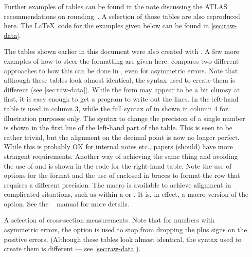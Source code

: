 \documentclass[REPORT=false, UKenglish]{atlasdoc}
\begin{document}
Further examples of tables can be found in the note discussing the ATLAS recommendations on rounding~\cite{atlas-rounding}.
A selection of those tables are also reproduced here.
The \LaTeX\ code for the examples given below can be found in \cref{sec:raw-data}.

The tables shown earlier in this document were also created with .
A few more examples of how to steer the formatting are given here.
 compares two different approaches
to how this can be done  in , even for asymmetric errors.  Note that although these
tables look almost identical, the syntax used to create them is different (see \cref{sec:raw-data}).
While the form may appear to be a bit clumsy at first, it is easy enough to get a
program to write out the lines. In the left-hand table
 is used in column 3, while the full syntax of 
in shown in column 4 for illustration purposes only.
The syntax
to change the precision of a single number is shown in the first line of
the left-hand part of the table.
This is seen to be rather trivial,
but the alignment on the decimal point is now no longer perfect.
While this is probably OK for internal notes etc., papers
(should) have more stringent requirements.
Another way of achieving
the same thing and avoiding the use of  and
 is shown in the code for the right-hand table.
Note the
use of options for the  format and the use of  enclosed
in braces to format the row that requires a different precision.
The macro  is available to achieve alignment in complicated situations,
such as within a  or .
It is, in effect, a macro version of the  option.
See the ~\cite{siunitx} manual for more details.

\begin{table}[htbp]
  \caption{A selection of cross-section measurements. Note that
    for numbers with asymmetric errors, the option
     is used to stop
     from dropping the plus signs on the positive
    errors. (Although these tables look almost identical, the syntax used to
    create them is different --- see \cref{sec:raw-data}).}
  \label{tab:rounding:xsect}

  
  \quad
  
\end{table}
\end{document}
